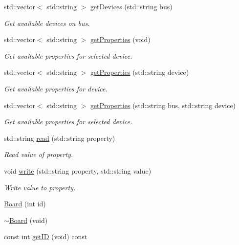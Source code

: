 \begin{DoxyCompactItemize}
std\+::vector$<$ std\+::string $>$ \hyperlink{class_board_ab137346e2910c2e18b5bfb31b958c43b}{get\+Devices} (std\+::string bus)
\begin{DoxyCompactList}\small\item\em Get available devices on bus. \end{DoxyCompactList}\item 
std\+::vector$<$ std\+::string $>$ \hyperlink{class_board_a6f3cc9b5301912690da4e0eb939b3081}{get\+Properties} (void)
\begin{DoxyCompactList}\small\item\em Get available properties for selected device. \end{DoxyCompactList}\item 
std\+::vector$<$ std\+::string $>$ \hyperlink{class_board_a1fab797a0fbec9d42b3462cb24488e8a}{get\+Properties} (std\+::string device)
\begin{DoxyCompactList}\small\item\em Get available properties for device. \end{DoxyCompactList}\item 
std\+::vector$<$ std\+::string $>$ \hyperlink{class_board_a6ddcad5c21427323e5062bd22feba405}{get\+Properties} (std\+::string bus, std\+::string device)
\begin{DoxyCompactList}\small\item\em Get available properties for selected device. \end{DoxyCompactList}\item 
std\+::string \hyperlink{class_board_a0b500bd590d15f797d1a36ecfeb0f5d4}{read} (std\+::string property)
\begin{DoxyCompactList}\small\item\em Read value of property. \end{DoxyCompactList}\item 
void \hyperlink{class_board_ab99bb344ee68485ab89e1ed5b9d79d4e}{write} (std\+::string property, std\+::string value)
\begin{DoxyCompactList}\small\item\em Write value to property. \end{DoxyCompactList}\item 
\hyperlink{class_board_af90e83a4779ac782ff5cf22957bfae05}{Board} (int id)
\item 
\hyperlink{class_board_a737c0ecdabeccd0460bcbae2f8ac6c44}{$\sim$\+Board} (void)
\item 
const int \hyperlink{class_board_ab55397409307355c61edca9cb4c5236c}{get\+ID} (void) const 
\end{DoxyCompactItemize}
